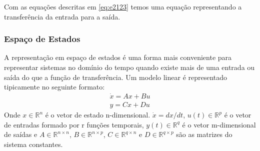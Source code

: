 Com as equações descritas em \eqref{eq:e2123} temos uma equação representando a transferência da entrada para a saída.
\subsubsection{Espaço de Estados}
A representação em espaço de estados é uma forma mais conveniente para representar sistemas no domínio do tempo quando existe mais de uma entrada ou saída do que a função de transferência. Um modelo linear é representado tipicamente no seguinte formato:
\begin{equation}\label{eq:ss}
\begin{array}{c}
\dot{x}=Ax+Bu\\
y=Cx+Du
\end{array}
\end{equation}
Onde $x \in \mathbb{R}^n$ é o vetor de estado n-dimensional. $\dot{x}=dx/dt$, $u(t) \in \mathbb{R}^p$ é o vetor de entradas formado por r funções temporais, $y(t) \in \mathbb{R}^q$ é o vetor m-dimensional de saídas e $A \in \mathbb{R}^{n\times n}$, $B \in \mathbb{R}^{n \times p}$, $C \in \mathbb{R}^{q \times n}$ e $D \in \mathbb{R} ^{q \times p}$ são as matrizes do sistema constantes.


